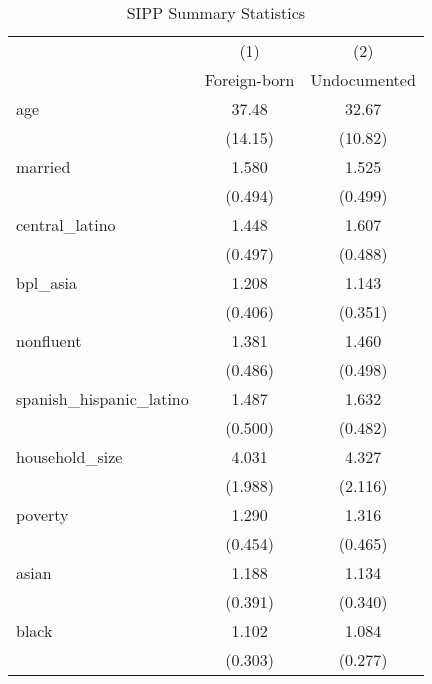 \begin{table}[htbp]\centering
\def\sym#1{\ifmmode^{#1}\else\(^{#1}\)\fi}
\caption{SIPP Summary Statistics \label{tab:sum}}
\begin{tabular}{l*{2}{c}}
\hline\hline
                    &\multicolumn{1}{c}{(1)}         &\multicolumn{1}{c}{(2)}         \\
                    &Foreign-born         &Undocumented         \\
\hline
age                 &       37.48         &       32.67         \\
                    &     (14.15)         &     (10.82)         \\
[1em]
married             &       1.580         &       1.525         \\
                    &     (0.494)         &     (0.499)         \\
[1em]
central\_latino      &       1.448         &       1.607         \\
                    &     (0.497)         &     (0.488)         \\
[1em]
bpl\_asia            &       1.208         &       1.143         \\
                    &     (0.406)         &     (0.351)         \\
[1em]
nonfluent           &       1.381         &       1.460         \\
                    &     (0.486)         &     (0.498)         \\
[1em]
spanish\_hispanic\_latino&       1.487         &       1.632         \\
                    &     (0.500)         &     (0.482)         \\
[1em]
household\_size      &       4.031         &       4.327         \\
                    &     (1.988)         &     (2.116)         \\
[1em]
poverty             &       1.290         &       1.316         \\
                    &     (0.454)         &     (0.465)         \\
[1em]
asian               &       1.188         &       1.134         \\
                    &     (0.391)         &     (0.340)         \\
[1em]
black               &       1.102         &       1.084         \\
                    &     (0.303)         &     (0.277)         \\

\end{tabular}
\end{table}
